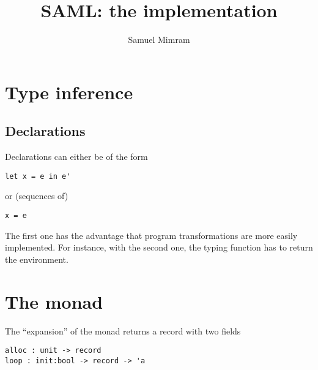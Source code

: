 \documentclass[a4paper]{article}
\title{SAML: the implementation}
\author{Samuel Mimram}
\begin{document}
\maketitle

\section{Type inference}
\subsection{Declarations}
Declarations can either be of the form
\begin{verbatim}
let x = e in e'
\end{verbatim}
or (sequences of)
\begin{verbatim}
x = e
\end{verbatim}
The first one has the advantage that program transformations are more easily
implemented. For instance, with the second one, the typing function has to
return the environment.

\section{The monad}
The ``expansion'' of the monad returns a record with two fields
\begin{verbatim}
alloc : unit -> record
loop : init:bool -> record -> 'a
\end{verbatim}
\end{document}

